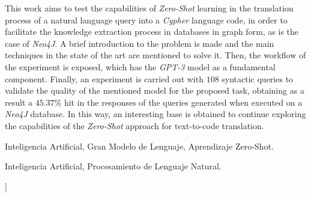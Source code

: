 \documentclass[a4paper,10pt,twocolumn]{article}
\begin{document}
\begin{enabstract}

	This work aims to test the capabilities of \textit{Zero-Shot} learning in the translation process of a natural language query into a \textit{Cypher} language code, in order to facilitate the knowledge extraction process in databases in graph form, as is the case of \textit{Neo4J}. A brief introduction to the problem is made and the main techniques in the state of the art are mentioned to solve it. Then, the workflow of the experiment is exposed, which has the \textit{GPT-3} model as a fundamental component. Finally, an experiment is carried out with $108$ syntactic queries to validate the quality of the mentioned model for the proposed task, obtaining as a result a $45.37\%$ hit in the responses of the queries generated when executed on a \textit{ Neo4J} database. In this way, an interesting base is obtained to continue exploring the capabilities of the \textit{Zero-Shot} approach for text-to-code translation.

\end{enabstract}

\begin{keywords}
	Inteligencia Artificial,
	Gran Modelo de Lenguaje,
	Aprendizaje Zero-Shot.
\end{keywords}

\begin{topics}
	Inteligencia Artificial, Procesamiento de Lenguaje Natural.
\end{topics}
\vspace{0.8cm}
]


\end{document}
